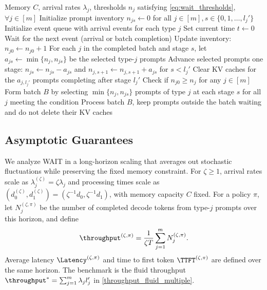 \begin{algorithm}[h]
\caption{WAIT: Waiting for Accumulated Inference Threshold}
\label{alg:wait}
{\small\linespread{1.0}\selectfont
\begin{algorithmic}[1]
\Require Memory $C$, arrival rates $\lambda_j$, thresholds $n_j$ satisfying \eqref{eq:wait_thresholds}, $\forall j \in [m]$
\State Initialize prompt inventory $n_{js} \gets 0$ for all $j \in [m], s \in \{0, 1, \dots, l_j'\}$
\State Initialize event queue with arrival events for each type $j$
\State Set current time $t \gets 0$
    \State Wait for the next event (arrival or batch completion)
        \State Update inventory: $n_{j0} \gets n_{j0} + 1$  
        \State For each $j$ in the completed batch and stage $s$, let $a_{js}\gets \min\{n_j,n_{js}\}$ be the selected type-$j$ prompts
        \State Advance selected prompts one stage: $n_{js}\gets n_{js}-a_{js}$ and $n_{j,s+1}\gets n_{j,s+1}+a_{js}$ for $s<l_j'$
        \State Clear KV caches for the $a_{j,l_j'}$ prompts completing after stage $l_j'$  
    \EndIf
    \State Check if $n_{j0} \geq n_j$ for any $j \in [m]$  
        \State Form batch $B$ by selecting $\min\{n_j, n_{js}\}$ prompts of type $j$ at each stage $s$ for all $j$ meeting the condition
        \State Process batch $B$, keep prompts outside the batch waiting and do not delete their KV caches
    \EndIf
\EndWhile
\end{algorithmic}
}
\end{algorithm}

\subsection{Asymptotic Guarantees}
\label{subsec:asymptotic_analysis}
\label{subsec:main_theorem}
We analyze WAIT in a long-horizon scaling that averages out stochastic fluctuations while preserving the fixed memory constraint. For \(\zeta\ge 1\), arrival rates scale as \(\lambda_j^{(\zeta)}=\zeta\lambda_j\) and processing times scale as \((d_0^{(\zeta)},d_1^{(\zeta)})=(\zeta^{-1}d_0,\zeta^{-1}d_1)\), with memory capacity \(C\) fixed. For a policy \(\pi\), let \(N_j^{(\zeta,\pi)}\) be the number of completed decode tokens from type-\(j\) prompts over this horizon, and define
\[
\throughput^{(\zeta, \pi)} = \frac{1}{\zeta T} \sum_{j=1}^m N_j^{(\zeta, \pi)}.
\]
Average latency \(\Latency^{(\zeta,\pi)}\) and time to first token \(\TTFT^{(\zeta,\pi)}\) are defined over the same horizon. The benchmark is the fluid throughput \(\throughput^*=\sum_{j=1}^m \lambda_j l_j'\) in \eqref{throughput_fluid_multiple}.

